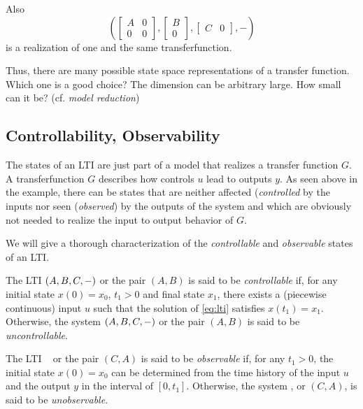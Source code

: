Also
\begin{equation*}
	(
	\begin{bmatrix} A & 0 \\ 0 & 0 \end{bmatrix},
	\begin{bmatrix} B \\ 0 \end{bmatrix},
	\begin{bmatrix} C & 0 \end{bmatrix}, -
	)
\end{equation*}
is a realization of one and the same transferfunction.

Thus, there are many possible state space representations of a transfer function. Which one is a good choice? The dimension can be arbitrary large. How small can it be? (cf. \emph{model reduction})

\subsection{Controllability, Observability}

The states of an LTI are just part of a model that realizes a transfer function $G$. A transferfunction $G$ describes how controls $u$ lead to outputs $y$. As seen above in the example, there can be states that are neither affected (\emph{controlled} by the inputs nor seen (\emph{observed}) by the outputs of the system and which are obviously not needed to realize the input to output behavior of $G$.  

We will give a thorough characterization of the \emph{controllable} and \emph{observable} states of an LTI. 

\begin{definition}
	The LTI $(A,B,C,-)$ or the pair $(A, B)$ is said to be \emph{controllable} if, for any initial state $x(0) = x_0$, $t_1 > 0$ and final state $x_1$, there exists a (piecewise continuous) input $u$ such that the solution of \eqref{eq:lti} satisfies $x(t_1 ) = x_1$. Otherwise, the system $(A,B,C,-)$ or the pair $(A, B)$ is said to be \emph{uncontrollable}.
\end{definition}


\begin{definition}
	The LTI \abcsys~ or the pair $(C,A)$ is said to be \emph{observable} if, for any $t_1 > 0$, the initial state $x(0) = x_0$ can be determined from the time history of the input $u$ and the output $y$ in the interval of $[0, t_1]$. Otherwise, the system \abcsys, or $(C, A)$, is said to be \emph{unobservable}.
\end{definition}

